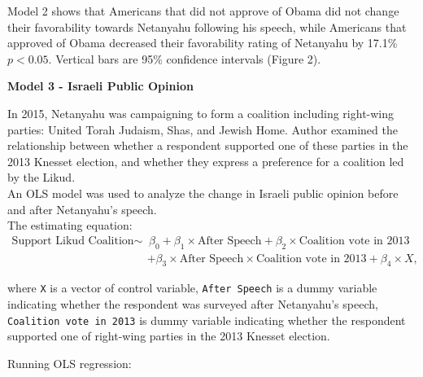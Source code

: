 \documentclass[12pt,letterpaper]{article}
\begin{document}
Model 2 shows that Americans that did not approve of Obama did not change their favorability towards Netanyahu following his speech, while Americans that approved of Obama decreased their favorability rating of Netanyahu by 17.1\% \(p<0.05\). Vertical bars are 95\% confidence intervals (Figure 2).
	
\begin{center}
		\noindent \textbf{Model 3 - Israeli Public Opinion}
\end{center}

In 2015, Netanyahu was campaigning to form a coalition including right-wing parties: United Torah Judaism, Shas, and Jewish Home. Author examined the relationship between whether a respondent supported one of these parties in the 2013 Knesset election, and whether they express a preference for a coalition led by the Likud. \\

An OLS model was used to analyze the change in Israeli public opinion before and after Netanyahu’s speech. \\

\noindent The estimating equation:
	\begin{align}
		\text{Support Likud Coalition} \sim & \, \beta_{0} + \beta_{1} \times \text{After Speech} + \beta_{2} \times \text{Coalition vote in 2013} \nonumber \\
		& + \beta_{3} \times \text{After Speech} \times \text{Coalition vote in 2013} + \beta_{4} \times X,
	\end{align}


\noindent where \texttt{X} is a vector of control variable, \texttt{After Speech}  is a dummy variable indicating whether the respondent was surveyed after Netanyahu’s speech, \texttt{Coalition vote in 2013} is dummy variable indicating whether the respondent supported one of right-wing parties in the 2013 Knesset election.

\vspace{0.5cm}
\noindent  Running OLS regression: 
 
\end{document}
